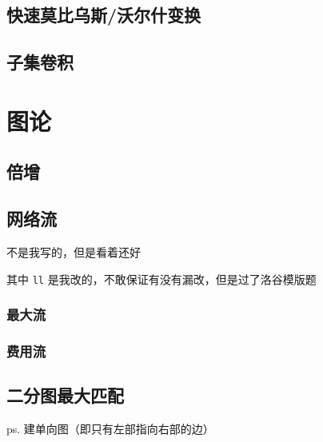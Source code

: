 \documentclass{article}
\begin{document}


\subsection{快速莫比乌斯/沃尔什变换}



\subsection{子集卷积}



\section{图论}

\subsection{倍增}



\subsection{网络流}

不是我写的，但是看着还好

其中 \lstinline{ll} 是我改的，不敢保证有没有漏改，但是过了洛谷模版题

\subsubsection{最大流}



\subsubsection{费用流}



\subsection{二分图最大匹配}

ps. 建单向图（即只有左部指向右部的边）
\end{document}
